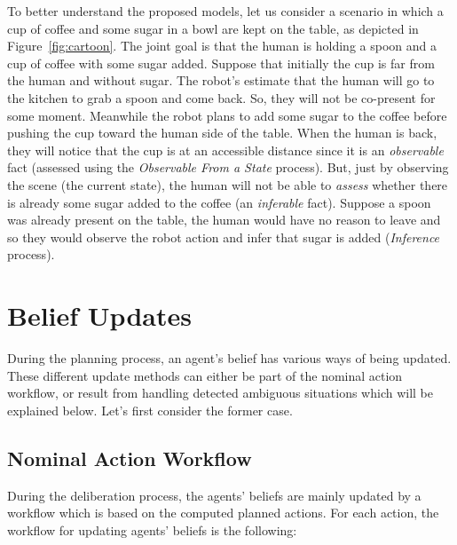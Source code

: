 \documentclass[letterpaper]{article} %
\begin{document}
To better understand the proposed models, let
us consider a scenario in which a cup of coffee and some sugar in a bowl are kept on the table, as depicted in Figure~\ref{fig:cartoon}. The joint goal is that the human is holding a spoon and a cup of coffee with some sugar added. Suppose that initially the cup is far from the human and without sugar. The robot's estimate that the human will go to the kitchen to grab a spoon and come back. So, they will not be co-present for some moment. 
Meanwhile the robot plans to add some sugar to the coffee before pushing the cup toward the human side of the table.
When the human is back, they will notice that the cup is at an accessible distance since it is an \textit{observable} fact (assessed using the \textit{Observable From a State} process). 
But, just by observing the scene (the current state), the human will not be able to \textit{assess} whether there is already some sugar added to the coffee (an \textit{inferable} fact). 
Suppose a spoon was already present on the table, the human would have no reason to leave and so they would observe the robot action and infer that sugar is added (\textit{Inference} process).


\section{Belief Updates}

During the planning process, an agent's belief has various ways of being updated. These different update methods can either be part of the nominal action workflow, or result from handling detected ambiguous situations which will be explained below. Let's first consider the former case.

\subsection{Nominal Action Workflow}

During the deliberation process, the agents' beliefs are mainly updated by a workflow which is based on the computed planned actions. 
For each action, the workflow for updating agents' beliefs is the following: 
\end{document}
